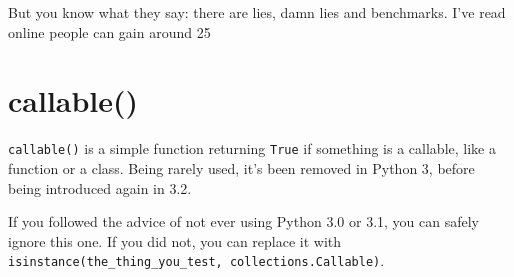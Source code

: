 But you know what they say: there are lies, damn lies and benchmarks. I've read online people can gain around 25%

\section{callable()}

\lstinline{callable()} is a simple function returning \lstinline{True} if something is a \gls{callable}, like a function or a class. Being rarely used, it's been removed in Python 3, before being introduced again in 3.2.

If you followed the advice of not ever using Python 3.0 or 3.1, you can safely ignore this one. If you did not, you can replace it with \lstinline{isinstance(the_thing_you_test, collections.Callable)}.
